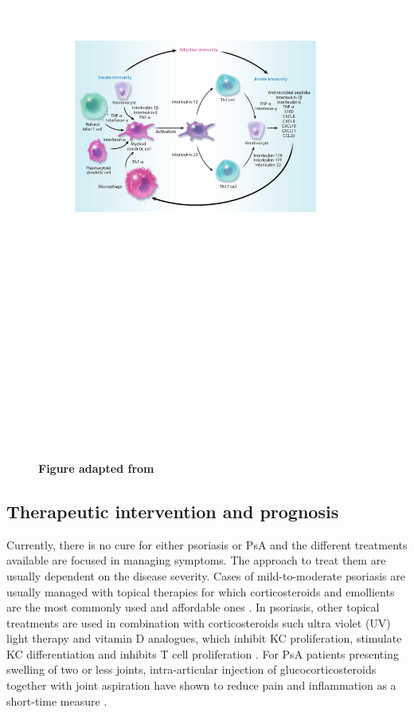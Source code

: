 \begin{figure}[H]
\includegraphics[width=\textwidth]{./Introduction/pdfs/PSO_adaptive_innate_immune_system_crosstalk.pdf}
\caption[Crosstalk between innate and adaptive immunity in psoriasis]{\textbf{Figure adapted from \parencite{Nestle2009}}}
\label{fig:PSO_immune_system_diagram}
\end{figure}

\subsection{Therapeutic intervention and prognosis}

Currently, there is no cure for either psoriasis or PsA and the different treatments available are focused in managing symptoms. The approach to treat them are usually dependent on the disease severity. Cases of mild-to-moderate psoriasis are usually managed with topical therapies for which corticosteroids and emollients are the most commonly used and affordable ones \parencite{Menter2009}. %
In psoriasis, other topical treatments are used in combination with corticosteroids such ultra violet (UV) light therapy and vitamin D analogues, which inhibit KC proliferation, stimulate KC differentiation and inhibits T cell proliferation \parencite{Rizova2001}. For PsA patients presenting swelling of two or less joints, intra-articular injection of glucocorticosteroids together with joint aspiration have shown to reduce pain and inflammation as a short-time measure \parencite{Coates2016}. 

